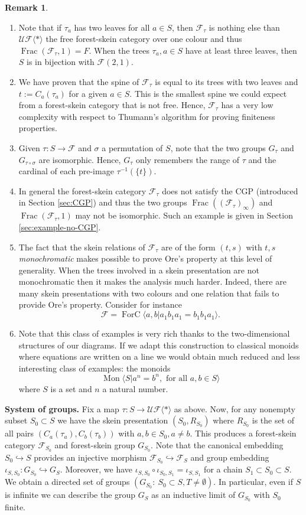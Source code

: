 \documentclass[a4paper, 12pt]{amsart}
\numberwithin{equation}{section}
\theoremstyle{definition}
\newtheorem{remark}[theorem]{Remark}
\newcommand{\cF}{\mathcal F}
\DeclareMathOperator{\Frac}{Frac}
\DeclareMathOperator{\FC}{ForC}
\newcommand{\into}{\hookrightarrow}
\newcommand{\la}{\langle}
\DeclareMathOperator{\Mon}{Mon}
\newcommand{\ra}{\rangle}
\newcommand{\cUF}{\mathcal{UF}}
\begin{document}
\begin{remark}\label{rem:tau}
\begin{enumerate}
\item Note that if $\tau_a$ has two leaves for all $a\in S$, then $\cF_\tau$ is nothing else than $\cUF\la*\ra$ the free forest-skein category over one colour and thus $\Frac(\cF_\tau,1)=F.$
When the trees $\tau_a,a\in S$ have at least three leaves, then $S$ is in bijection with $\cF(2,1)$.
\item 
We have proven that the spine of $\cF_\tau$ is equal to its trees with two leaves and $t:=C_a(\tau_a)$ for a given $a\in S$.
This is the smallest spine we could expect from a forest-skein category that is not free. 
Hence, $\cF_\tau$ has a very low complexity with respect to Thumann's algorithm for proving finiteness properties. 
\item
Given $\tau:S\to \cF$ and $\sigma$ a permutation of $S$, note that the two groups $G_\tau$ and $G_{\tau\circ \sigma}$ are isomorphic. Hence, $G_\tau$ only remembers the range of $\tau$ and the cardinal of each pre-image $\tau^{-1}(\{t\})$.
\item In general the forest-skein category $\cF_\tau$ does not satisfy the CGP (introduced in Section \ref{sec:CGP}) and thus the two groups $\Frac((\cF_\tau)_\infty)$ and $\Frac(\cF_\tau,1)$ may not be isomorphic. Such an example is given in Section \ref{sec:example-no-CGP}.
\item
The fact that the skein relations of $\cF_\tau$ are of the form $(t,s)$ with $t,s$ {\it monochromatic} makes possible to prove Ore's property at this level of generality. When the trees involved in a skein presentation are not monochromatic then it makes the analysis much harder. Indeed, there are many skein presentations with two colours and one relation that fails to provide Ore's property.
Consider for instance $$\cF=\FC\la a,b| a_1b_1a_1= b_1b_1a_1\ra.$$
\item
Note that this class of examples is very rich thanks to the two-dimensional structures of our diagrams. 
If we adapt this construction to classical monoids where equations are written on a line we would obtain much reduced and less interesting class of examples: the monoids 
$$\Mon\la S| a^n=b^n, \text{ for all } a,b\in S\ra$$
where $S$ is a set and $n$ a natural number.
\end{enumerate}
\end{remark}

{\bf System of groups.}
Fix a map $\tau:S\to\cUF\la *\ra$ as above. 
Now, for any nonempty subset $S_0\subset S$ we have the skein presentation $(S_0,R_{S_0})$ where $R_{S_0}$ is the set of all pairs $(C_a(\tau_a),C_b(\tau_b))$ with $a,b\in S_0, a\neq b$.
This produces a forest-skein category $\cF_{S_0}$ and forest-skein group $G_{S_0}$.
Note that the canonical embedding $S_0\into S$ provides an injective morphism $\cF_{S_0}\into \cF_S$ and group embedding $\iota_{S,S_0}:G_{S_0}\into G_S$.
Moreover, we have $\iota_{S,S_0}\circ \iota_{S_0,S_1}=\iota_{S,S_1}$ for a chain $S_1\subset S_0\subset S$.
We obtain a directed set of groups $(G_{S_0}:\ S_0\subset S, T\neq\emptyset).$
In particular, even if $S$ is infinite we can describe the group $G_S$ as an inductive limit of $G_{S_0}$ with $S_0$ finite.
\end{document}
